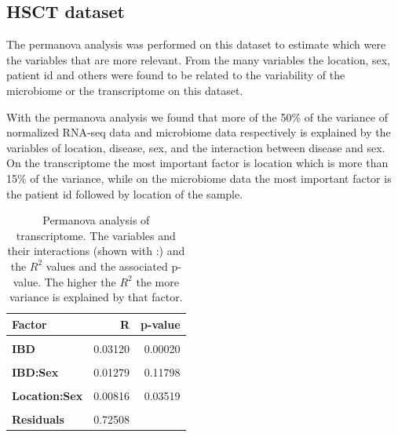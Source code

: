 \documentclass[
  a4paper,
]{book}
\begin{document}
\hypertarget{results-hsct}{%
\subsection{HSCT dataset}\label{results-hsct}}

The permanova analysis was performed on this dataset to estimate which were the variables that are more relevant.
From the many variables the location, sex, patient id and others were found to be related to the variability of the microbiome or the transcriptome on this dataset.

With the permanova analysis we found that more of the 50\% of the variance of normalized RNA-seq data and microbiome data respectively is explained by the variables of location, disease, sex, and the interaction between disease and sex.
On the transcriptome the most important factor is location which is more than 15\% of the variance, while on the microbiome data the most important factor is the patient id followed by location of the sample.

\begin{table}[H]

\caption[Permanova analysis of transcriptome.]{\label{tab:hsct-permanova-rnaseq}Permanova analysis of transcriptome. The variables and their interactions (shown with :) and the $R^2$ values and the associated p-value. The higher the $R^2$ the more variance is explained by that factor.}
\centering
\begin{tabular}[t]{|>{}l|r|>{}r|}
\hline
\textbf{Factor} & \textbf{R} & \textbf{p-value}\\
\hline
\textbf{\cellcolor{gray!6}{Location}} & \cellcolor{gray!6}{0.18057} & \cellcolor{gray!6}{0.00020}\\
\hline
\textbf{IBD} & 0.03120 & 0.00020\\
\hline
\textbf{\cellcolor{gray!6}{Sex}} & \cellcolor{gray!6}{0.01306} & \cellcolor{gray!6}{0.00120}\\
\hline
\textbf{IBD:Sex} & 0.01279 & 0.11798\\
\hline
\textbf{\cellcolor{gray!6}{Location:IBD}} & \cellcolor{gray!6}{0.02427} & \cellcolor{gray!6}{0.11458}\\
\hline
\textbf{Location:Sex} & 0.00816 & 0.03519\\
\hline
\textbf{\cellcolor{gray!6}{Location:IBD:Sex}} & \cellcolor{gray!6}{0.00486} & \cellcolor{gray!6}{0.52190}\\
\hline
\textbf{Residuals} & 0.72508 & \\
\hline
\end{tabular}
\end{table}
\end{document}
